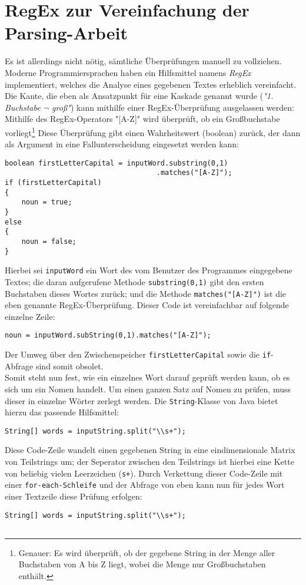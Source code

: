 \documentclass[12pt,twoside]{article}
\theoremstyle{plain}
\theoremstyle{definition}
\theoremstyle{remark}
\begin{document}
{\section{RegEx zur Vereinfachung der Parsing-Arbeit}
\label{sec:regex}
Es ist allerdings nicht nötig, sämtliche Überprüfungen manuell zu vollziehen. Moderne Programmiersprachen haben ein Hilfsmittel namens \textit{RegEx} implementiert, welches die Analyse eines gegebenen Textes erheblich vereinfacht.
Die Kante, die eben als Ansatzpunkt für eine Kaskade genannt wurde (\textit{"1. Buchstabe $\lnot$ groß"}) kann mithilfe einer RegEx-Überprüfung ausgelassen werden: Mithilfe des RegEx-Operators "[A-Z]" wird überprüft, ob ein Großbuchstabe vorliegt\footnote{Genauer: Es wird überprüft, ob der gegebene String in der Menge aller Buchstaben von A bis Z liegt, wobei die Menge nur Großbuchstaben enthält.}
Diese Überprüfung gibt einen Wahrheitswert (boolean) zurück, der dann als Argument in eine Fallunterscheidung eingesetzt werden kann:
\begin{lstlisting}
boolean firstLetterCapital = inputWord.substring(0,1)
									.matches("[A-Z]");
if (firstLetterCapital)
{
	noun = true;
}
else
{
	noun = false;
}
\end{lstlisting}
Hierbei sei \texttt{inputWord} ein Wort des vom Benutzer des Programmes eingegebene Textes; die daran aufgerufene Methode \texttt{substring(0,1)} gibt den ersten Buchstaben dieses Wortes zurück; und die Methode \texttt{matches("[A-Z]")} ist die eben genannte RegEx-Überprüfung.
Dieser Code ist vereinfachbar auf folgende einzelne Zeile:
\begin{lstlisting}
noun = inputWord.subString(0,1).matches("[A-Z]");
\end{lstlisting}
Der Umweg über den Zwischenspeicher \texttt{firstLetterCapital} sowie die \texttt{if}-Abfrage sind somit obsolet.\\
Somit steht nun fest, wie ein einzelnes Wort darauf geprüft werden kann, ob es sich um ein Nomen handelt.
Um einen ganzen Satz auf Nomen zu prüfen, muss dieser in einzelne Wörter zerlegt werden.
Die \texttt{String}-Klasse von Java bietet hierzu das passende Hilfsmittel:
\begin{lstlisting}
String[] words = inputString.split("\\s+");
\end{lstlisting}
Diese Code-Zeile wandelt einen gegebenen String in eine eindimensionale Matrix von Teilstrings um; der Seperator zwischen den Teilstrings ist hierbei eine Kette von beliebig vielen Leerzeichen (\texttt{s+}).
Durch Verkettung dieser Code-Zeile mit einer \texttt{for-each-Schleife} und der Abfrage von eben kann nun für jedes Wort einer Textzeile diese Prüfung erfolgen:
\begin{lstlisting}
String[] words = inputString.split("\\s+");


\end{lstlisting}}
\end{document}

